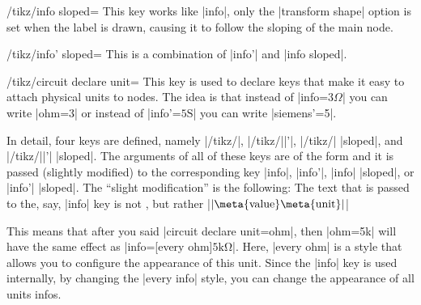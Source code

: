 \begin{key}{/tikz/info sloped=}
  This key works like |info|, only the |transform shape| option is set
  when the label is drawn, causing it to follow the sloping of the
  main node. 
\begin{codeexample}[]
\end{codeexample}
\end{key}

\begin{key}{/tikz/info' sloped=}
  This is a combination of |info'| and |info sloped|.
\begin{codeexample}[]
\end{codeexample}
\end{key}

\begin{key}{/tikz/circuit declare unit=}
  This key is used to declare keys that make it easy to attach
  physical units to nodes. The idea is that instead of
  |info=$3\Omega$| you can write |ohm=3| or instead of
  |info'=$5\mathrm{S}$| you can write |siemens'=5|.

  In detail, four keys are defined, namely |/tikz/|,
  |/tikz/||'|, |/tikz/| |sloped|, and
  |/tikz/||'| |sloped|. The arguments of all of these keys
  are of the form
   and it is
  passed (slightly modified) to the corresponding key |info|, |info'|,
  |info| |sloped|, or |info'| |sloped|. The ``slight modification'' is the
  following: The text that is passed to the, say, |info| key is not
  , but rather |$\mathrm{|\meta{value}\meta{unit}|}$|
  
  This means that after you said |circuit declare unit={ohm}{\Omega}|,
  then |ohm=5k| will have the same effect as
  |info={[every ohm]$\mathrm{5k\Omega}$}|. Here, |every ohm| is a
  style that allows you to configure the appearance of this unit.   
  Since the |info| key is used internally, by changing the
  |every info| style, you can change the appearance of all units
  infos.
\begin{codeexample}[]
\end{codeexample}
\end{key}


